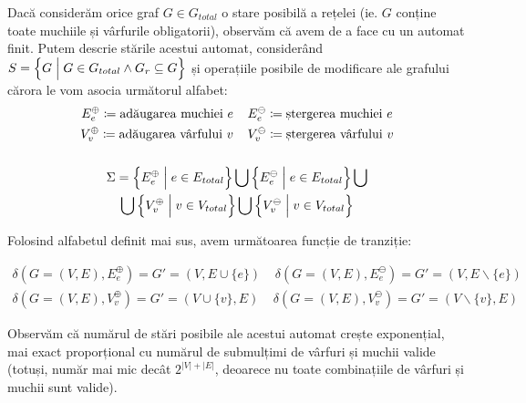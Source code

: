 Dacă considerăm orice graf $G \in G_{total}$ o stare posibilă a rețelei (ie. $G$ conține toate muchiile și vârfurile obligatorii), observăm că avem de a face cu un automat finit. Putem descrie stările acestui automat, considerând $S = \Big{\{} G  \; \Big{|} \; G \in G_{total} \land G_{r} \subseteq G \Big{\}}$ și operațiile posibile de modificare ale grafului cărora le vom asocia următorul alfabet:
\begin{gather*}
    E^\oplus_e \coloneqq \text{adăugarea muchiei } e \;\;\;\; E^\ominus_e \coloneqq \text{ștergerea muchiei } e \\
    V^\oplus_v \coloneqq \text{adăugarea vârfului } v \;\;\;\; V^\ominus_v \coloneqq \text{ștergerea vârfului } v \\
    \\
    \Sigma = \Big{\{} E^\oplus_e \; \Big{|} \; e \in E_{total} \Big{\}} \bigcup
    \Big{\{} E^\ominus_e \; \Big{|} \; e \in E_{total}  \Big{\}} \bigcup \\
    \bigcup \Big{\{} V^\oplus_v \; \Big{|} \; v \in V_{total} \Big{\}} \bigcup
    \Big{\{} V^\ominus_v \; \Big{|} \; v \in V_{total} \Big{\}}
\end{gather*}

Folosind alfabetul definit mai sus, avem următoarea funcție de tranziție:

\begin{gather*}
    \delta(G = (V, E), E^\oplus_e) = G' = (V, E \cup \{e\}) \;\;\;\; \delta(G = (V, E), E^\ominus_e) = G' = (V, E \backslash \{e\}) \\
    \delta(G = (V, E), V^\oplus_v) = G' = (V \cup \{v\}, E) \;\;\;\; \delta(G = (V, E), V^\ominus_v) = G' = (V \backslash \{v\}, E)
\end{gather*}

Observăm că numărul de stări posibile ale acestui automat crește exponențial, mai exact proporțional cu numărul de submulțimi de vârfuri și muchii valide (totuși, număr mai mic decât $2^{|V| + |E|}$, deoarece nu toate combinațiile de vârfuri și muchii sunt valide).


